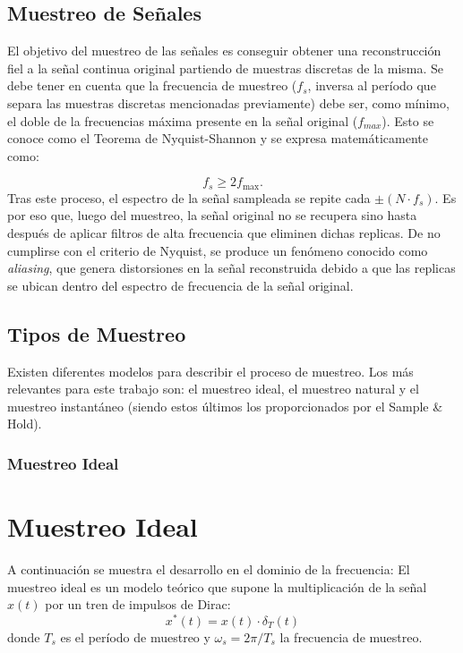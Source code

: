 
\subsection{Muestreo de Señales}
El objetivo del muestreo de las señales es conseguir obtener una reconstrucción fiel a la señal continua original partiendo de muestras discretas de la misma.
Se debe tener en cuenta que la frecuencia de muestreo ($f_s$, inversa al período que separa las muestras discretas mencionadas previamente) debe ser, como mínimo, el doble de la frecuencias máxima presente en la señal original ($f_{max}$). Esto se conoce como el Teorema de Nyquist-Shannon y se expresa matemáticamente como:

\begin{equation}
    f_s \geq 2 f_{\max}.
\end{equation}
Tras este proceso, el espectro de la señal sampleada se repite cada $\pm (N\cdot f_s)$. Es por eso que, luego del muestreo, la señal original no se recupera sino hasta después de aplicar filtros de alta frecuencia que eliminen dichas replicas.
De no cumplirse con el criterio de Nyquist, se produce un fenómeno conocido como \textit{aliasing}, que genera distorsiones en la señal reconstruida debido a que las replicas se ubican dentro del espectro de frecuencia de la señal original.

\subsection{Tipos de Muestreo}
Existen diferentes modelos para describir el proceso de muestreo. Los más relevantes para este trabajo son: el muestreo ideal, el muestreo natural y el muestreo instantáneo (siendo estos últimos los proporcionados por el Sample \& Hold).

\subsubsection{Muestreo Ideal}
\section*{Muestreo Ideal}


A continuación se muestra el desarrollo en el dominio de la frecuencia:
El muestreo ideal es un modelo teórico que supone la multiplicación de la señal $x(t)$ por un tren de
impulsos de Dirac:
\begin{equation}
    x^*(t) = x(t) \cdot \delta_T(t)
\end{equation}
donde $T_s$ es el período de muestreo y $\omega_s = 2\pi/T_s$ la frecuencia de muestreo. 


